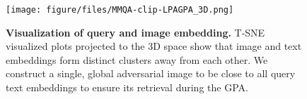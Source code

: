 \begin{figure}[t]
    \centering
    \texttt{[image: figure/files/MMQA-clip-LPAGPA\_3D.png]}
    \caption{\textbf{Visualization of query and image embedding.} T-SNE visualized plots projected to the 3D space show that image and text embeddings form distinct clusters away from each other. We construct a single, {global adversarial image} to be close to all query text embeddings to ensure its retrieval during the GPA.}
    \label{fig:transfer_tsne}
\end{figure}